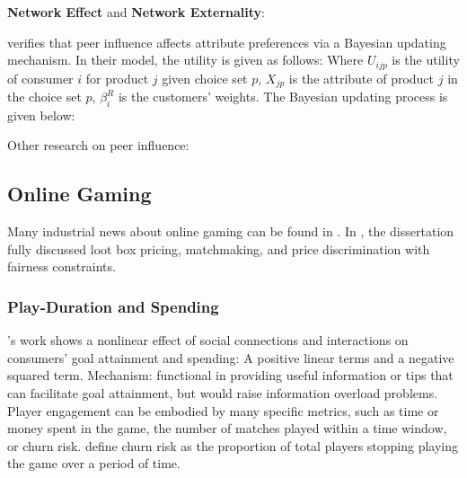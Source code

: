 \documentclass[10pt]{report}
\begin{document}
\textbf{Network Effect} and \textbf{Network Externality}:

\cite{Narayan2011} verifies that peer influence affects attribute preferences via a Bayesian updating mechanism. In
their model, the utility is given as follows:
Where $U_{ijp}$ is the utility of consumer $i$ for product $j$ given choice set $p$, $X_{jp}$ is the attribute of
product $j$ in the choice set $p$, $\beta_i^R$ is the customers' weights. The Bayesian updating process is given below:

Other research on peer influence:

\subsection{Online Gaming}

Many industrial news about online gaming can be found in \cite{Chen2017}.
In \cite{lei2022revenue}, the dissertation fully discussed loot box pricing, matchmaking, and
price discrimination with fairness constraints.

\subsubsection{Play-Duration and Spending}

\cite{Zhang2017}'s work shows a nonlinear effect of social connections and interactions
on consumers’ goal attainment and spending: A positive linear terms and a negative squared term. Mechanism:
functional in providing useful information or tips that can facilitate goal attainment,
but would raise information overload problems.\\

Player engagement can be embodied by many specific metrics, such as time or money
spent in the game, the number of matches played within a time window, or churn risk.
\cite{Chen2017} define churn risk as the proportion of total players stopping playing the game over a period of time.
\end{document}
